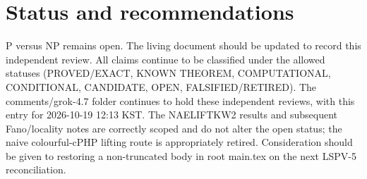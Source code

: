 \documentclass[11pt]{article}
\begin{document}
\section{Status and recommendations}
P versus NP remains open. The living document should be updated to record this independent review. All claims continue to be classified under the allowed statuses (PROVED/EXACT, KNOWN THEOREM, COMPUTATIONAL, CONDITIONAL, CANDIDATE, OPEN, FALSIFIED/RETIRED). The comments/grok-4.7 folder continues to hold these independent reviews, with this entry for 2026-10-19 12:13 KST. The NAELIFTKW2 results and subsequent Fano/locality notes are correctly scoped and do not alter the open status; the naive colourful-cPHP lifting route is appropriately retired. Consideration should be given to restoring a non-truncated body in root main.tex on the next LSPV-5 reconciliation.

\end{document}
